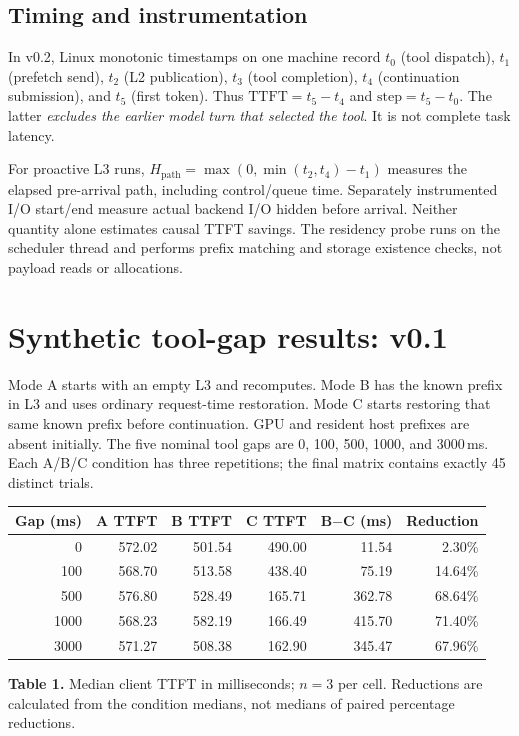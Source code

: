 \documentclass[10pt,a4paper]{article}
\newcommand{\pagemark}{\newpage}
\begin{document}
\subsection{Timing and instrumentation}
In v0.2, Linux monotonic timestamps on one machine record $t_0$ (tool dispatch), $t_1$ (prefetch send), $t_2$ (L2 publication), $t_3$ (tool completion), $t_4$ (continuation submission), and $t_5$ (first token). Thus $\mathrm{TTFT}=t_5-t_4$ and $\mathrm{step}=t_5-t_0$. The latter \emph{excludes the earlier model turn that selected the tool}. It is not complete task latency.

For proactive L3 runs, $H_{\mathrm{path}}=\max(0,\min(t_2,t_4)-t_1)$ measures the elapsed pre-arrival path, including control/queue time. Separately instrumented I/O start/end measure actual backend I/O hidden before arrival. Neither quantity alone estimates causal TTFT savings. The residency probe runs on the scheduler thread and performs prefix matching and storage existence checks, not payload reads or allocations.

\pagemark
\section{Synthetic tool-gap results: v0.1}
Mode A starts with an empty L3 and recomputes. Mode B has the known prefix in L3 and uses ordinary request-time restoration. Mode C starts restoring that same known prefix before continuation. GPU and resident host prefixes are absent initially. The five nominal tool gaps are 0, 100, 500, 1000, and 3000\,ms. Each A/B/C condition has three repetitions; the final matrix contains exactly 45 distinct trials.

\begin{center}\small
\begin{tabular}{@{}rrrrrr@{}}\toprule
Gap (ms)& A TTFT & B TTFT & C TTFT & B$-$C (ms)& Reduction\\\midrule
0&572.02&501.54&490.00&11.54&2.30\%\\
100&568.70&513.58&438.40&75.19&14.64\%\\
500&576.80&528.49&165.71&362.78&68.64\%\\
1000&568.23&582.19&166.49&415.70&71.40\%\\
3000&571.27&508.38&162.90&345.47&67.96\%\\\bottomrule
\end{tabular}
\end{center}
{\small\textbf{Table 1.} Median client TTFT in milliseconds; $n=3$ per cell. Reductions are calculated from the condition medians, not medians of paired percentage reductions.}
\end{document}
